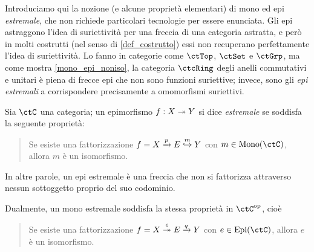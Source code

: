 Introduciamo qui la nozione (e alcune proprietà elementari) di mono ed epi \emph{estremale}, che non richiede particolari tecnologie per essere enunciata. Gli epi astraggono l'idea di suriettività per una freccia di una categoria astratta, e però in molti costrutti (nel senso di \ref{def_costrutto}) essi non recuperano perfettamente l'idea di suriettività. Lo fanno in categorie come $\ctTop$, $\ctSet$ e $\ctGrp$, ma come mostra \ref{mono_epi_noniso}, la categoria $\ctcRing$ degli anelli commutativi e unitari è piena di frecce epi che non sono funzioni suriettive; invece, sono gli \emph{epi estremali} a corrispondere precisamente a omomorfismi suriettivi.%
\begin{definition}\label{def_monoepi_estrem}
	Sia $\ctC$ una categoria; un epimorfismo $f : X \twoheadrightarrow Y$ si dice \emph{estremale} se soddisfa la seguente proprietà: 
	\begin{quote}
		Se esiste una fattorizzazione $f = X \xrightarrow{p} E \overset m{\hookrightarrow} Y$ con $m \in\Mono[\ctC]$, allora $m$ è un isomorfismo.
	\end{quote}
	In altre parole, un epi estremale è una freccia che non si fattorizza attraverso nessun sottoggetto proprio del suo codominio.

	Dualmente, un mono estremale soddisfa la stessa proprietà in $\ctC^\op$, cioè  
	\begin{quote}
		Se esiste una fattorizzazione $f = X \overset e{\twoheadrightarrow} E \xrightarrow{q} Y$ con $e \in\Epi[\ctC]$, allora $e$ è un isomorfismo.
	\end{quote}
\end{definition}
